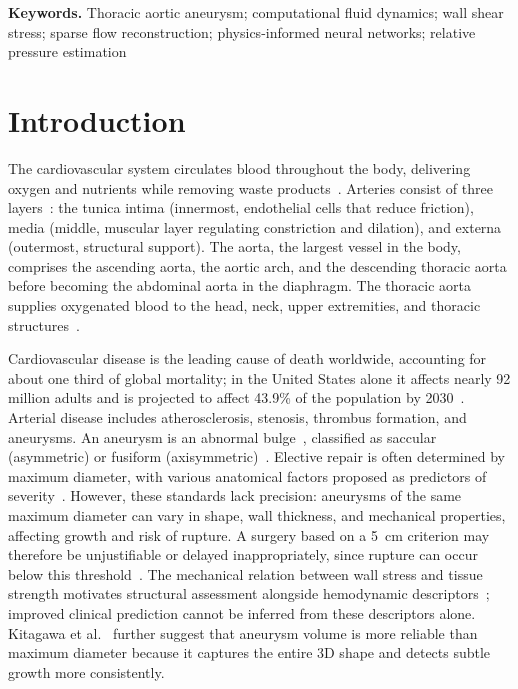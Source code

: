 \documentclass[12pt,a4paper]{article}
\newcommand{\cfdrevision}[1]{#1} %
\newcommand{\WSS}{\ac{wss}\xspace}
\theoremstyle{definition}
\numberwithin{equation}{section}
\providecommand{\DIFaddtex}[1]{{\protect\color{blue} \sf #1}} %
\providecommand{\DIFdeltex}[1]{{\protect\color{red} \scriptsize #1}} %
\providecommand{\DIFaddbegin}{} %
\providecommand{\DIFaddend}{} %
\providecommand{\DIFdelbegin}{} %
\providecommand{\DIFdelend}{} %
\providecommand{\DIFadd}[1]{\texorpdfstring{\DIFaddtex{#1}}{#1}} %
\providecommand{\DIFdel}[1]{\texorpdfstring{\DIFdeltex{#1}}{}} %
\newcommand{\DIFscaledelfig}{0.5}
\newlength{\DIFdelgraphicswidth} %
\newlength{\DIFdelgraphicsheight} %
\newcommand{\DIFaddincludegraphics}[2][]{{\color{blue}\fbox{\DIFOincludegraphics[#1]{#2}}}} %
\newcommand{\DIFdelincludegraphics}[2][]{%
\sbox{\DIFdelgraphicsbox}{\DIFOincludegraphics[#1]{#2}}%
\settoboxwidth{\DIFdelgraphicswidth}{\DIFdelgraphicsbox} %
\settoboxtotalheight{\DIFdelgraphicsheight}{\DIFdelgraphicsbox} %
\scalebox{\DIFscaledelfig}{%
\parbox[b]{\DIFdelgraphicswidth}{\usebox{\DIFdelgraphicsbox}\\[-\baselineskip] \rule{\DIFdelgraphicswidth}{0em}}\llap{\resizebox{\DIFdelgraphicswidth}{\DIFdelgraphicsheight}{%
\setlength{\unitlength}{\DIFdelgraphicswidth}%
\begin{picture}(1,1)%
\thicklines\linethickness{2pt} %
{\color[rgb]{1,0,0}\put(0,0){\framebox(1,1){}}}%
{\color[rgb]{1,0,0}\put(0,0){\line( 1,1){1}}}%
{\color[rgb]{1,0,0}\put(0,1){\line(1,-1){1}}}%
\end{picture}%
}\hspace*{3pt}}} %
} %
\DeclareRobustCommand{\DIFaddbegin}{\DIFOaddbegin \let\includegraphics\DIFaddincludegraphics} %
\DeclareRobustCommand{\DIFaddend}{\DIFOaddend \let\includegraphics\DIFOincludegraphics} %
\DeclareRobustCommand{\DIFdelbegin}{\DIFOdelbegin \let\includegraphics\DIFdelincludegraphics} %
\DeclareRobustCommand{\DIFdelend}{\DIFOaddend \let\includegraphics\DIFOincludegraphics} %
\renewcommand{\DIFaddtex}[1]{{\protect\color{red}#1}}
\renewcommand{\DIFdeltex}[1]{}
\renewcommand{\DIFdel}[1]{}
\renewcommand{\DIFaddincludegraphics}[2][]{\DIFOincludegraphics[#1]{#2}}
\renewcommand{\DIFdelincludegraphics}[2][]{}
\renewcommand{\cfdrevision}[1]{\textcolor{red}{#1}}
\def\DIFaddbegin{}\def\DIFaddend{}%
\def\DIFdelbegin{}\def\DIFdelend{}%
\def\cfdrevision#1{#1}%
\begin{document}
\acresetall

\noindent\textbf{Keywords.} Thoracic aortic aneurysm; computational fluid dynamics; wall shear stress; sparse flow reconstruction; physics-informed neural networks; relative pressure estimation


\section{Introduction}
\label{sec:introduction}

The cardiovascular system circulates blood throughout the body, delivering oxygen and nutrients while removing waste products~\cite{heymans1960reflexogenic}. Arteries consist of three layers~\cite{holzapfel2010modelling}: the tunica intima (innermost, endothelial cells that reduce friction), media (middle, muscular layer regulating constriction and dilation), and externa (outermost, structural support). The aorta, the largest vessel in the body, comprises the ascending aorta, the aortic arch, and the descending thoracic aorta before becoming the abdominal aorta in the diaphragm. The thoracic aorta supplies oxygenated blood to the head, neck, upper extremities, and thoracic structures~\cite{tran2018anatomy}.

Cardiovascular disease is the leading cause of death worldwide, accounting for about one third of global mortality; in the United States alone it affects nearly 92 million adults and is projected to affect 43.9\% of the population by 2030~\cite{Randles_CFD_2017}. Arterial disease includes atherosclerosis, stenosis, thrombus formation, and aneurysms. An aneurysm is an abnormal bulge~\cite{Les_et_al_2010}, classified as saccular (asymmetric) or fusiform (axisymmetric)~\cite{sakalihasan2018abdominal}. Elective repair is often determined by maximum diameter, with various anatomical factors proposed as predictors of severity~\cite{cronenwett1990variables, lipp2020computational}. However, these standards lack precision: aneurysms of the same maximum diameter can vary in shape, wall thickness, and mechanical properties, affecting growth and risk of rupture. A surgery based on a 5~cm criterion may therefore be unjustifiable or delayed inappropriately, since rupture can occur below this threshold~\cite{darling1977autopsy, belkacemi2022flow}. \DIFdelbegin \DIFdel{Since rupture occurs when mechanical stress exceeds tissue tensile strength, risk assessment based on }%
\DIFdel{and hemodynamics provides more accurate prediction~\mbox{%
\cite{bilgi2020effects, vorp1998mechanical}}\hskip0pt%
. }\DIFdelend \DIFaddbegin \DIFadd{\cfdrevision{The mechanical relation between wall stress and tissue strength motivates structural assessment alongside hemodynamic descriptors~\cite{bilgi2020effects, vorp1998mechanical}; improved clinical prediction cannot be inferred from these descriptors alone.} }\DIFaddend Kitagawa et al.~\cite{kitagawa2013role} further suggest that aneurysm volume is more reliable than maximum diameter because it captures the entire 3D shape and detects subtle growth more consistently.
\end{document}
